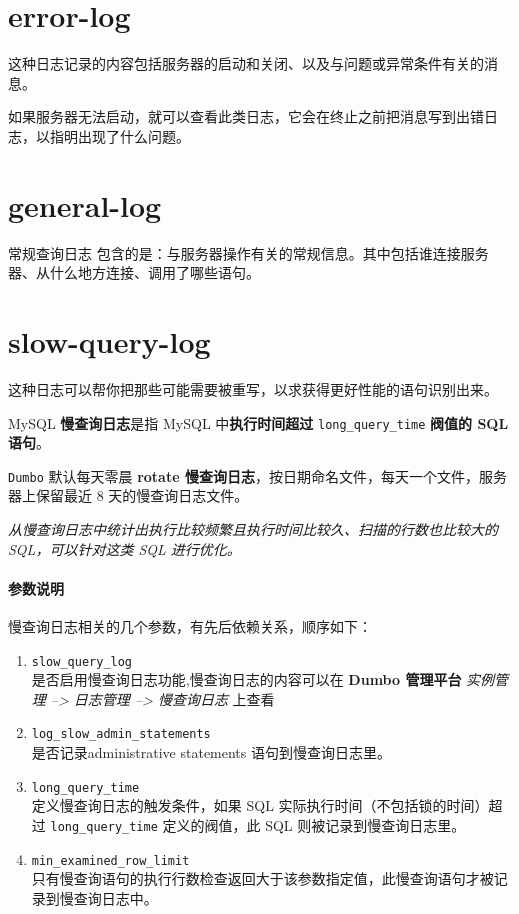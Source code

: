 \documentclass[UTF8,a4paper,12pt]{ctexbook}
\begin{document}
	
	\section{error-log}
		这种日志记录的内容包括服务器的启动和关闭、以及与问题或异常条件有关的消息。 
		
		如果服务器无法启动，就可以查看此类日志，它会在终止之前把消息写到出错日志，以指明出现了什么问题。
		
	\section{general-log}
		常规查询日志 包含的是：与服务器操作有关的常规信息。其中包括谁连接服务器、从什么地方连接、调用了哪些语句。	
		
		
	
	\section{slow-query-log}
		这种日志可以帮你把那些可能需要被重写，以求获得更好性能的语句识别出来。
	
		MySQL \textbf{慢查询日志}是指 MySQL 中\textbf{执行时间超过} \verb|long_query_time| \textbf{阀值的 SQL 语句}。
		
		\verb|Dumbo| 默认每天零晨 \textbf{rotate 慢查询日志}，按日期命名文件，每天一个文件，服务器上保留最近 8 天的慢查询日志文件。
		
		\textit{从慢查询日志中统计出执行比较频繁且执行时间比较久、扫描的行数也比较大的 SQL，可以针对这类 SQL 进行优化。}
	
		\paragraph{参数说明}
			慢查询日志相关的几个参数，有先后依赖关系，顺序如下：
			\begin{enumerate}[itemindent = 2em, itemsep = 0pt,partopsep=0pt]
				\item \verb|slow_query_log| \\ 是否启用慢查询日志功能,慢查询日志的内容可以在 \textbf{Dumbo 管理平台} \textit{实例管理 --> 日志管理 --> 慢查询日志} 上查看
				\item \verb|log_slow_admin_statements| \\ 是否记录administrative statements 语句到慢查询日志里。
				\item \verb|long_query_time| \\ 定义慢查询日志的触发条件，如果 SQL 实际执行时间（不包括锁的时间）超过 \verb|long_query_time| 定义的阀值，此 SQL 则被记录到慢查询日志里。
				\item \verb|min_examined_row_limit| \\ 只有慢查询语句的执行行数检查返回大于该参数指定值，此慢查询语句才被记录到慢查询日志中。
			\end{enumerate}
			
\end{document}
